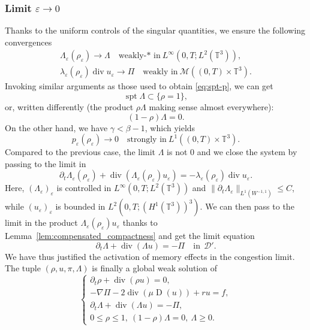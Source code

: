 \documentclass[JEP,XML,SOM,Unicode,NoEqCountersInSection]{cedram}
\let\mathcal\mathscr
\newcommand{\<}{\bigl\langle}
\renewcommand{\>}{\bigr\rangle}
\DeclareMathOperator{\spt}{spt}
\newcommand{\labeleq}[1]{}
\newenvironment{subnumcasess}{\begin{equation*}\begin{cases}}{\end{cases}\end{equation*}}
\theoremstyle{definition}
\theoremstyle{remark}
\newcommand{\TT}{\mathbb{T}^3}
\DeclareMathOperator{\Div}{div}
\DeclareMathOperator{\D}{D}
\let\ep\varepsilon
\begin{document}
\subsubsection{Limit $\ep \rightarrow 0$}
Thanks to the uniform controls of the singular quantities, we ensure the following convergences
\begin{gather*}
\Lambda_\ep(\rho_\ep) \to \Lambda \quad \text{weakly-* in} ~ L^\infty(0,T;L^2(\TT)),\\
\lambda_\ep(\rho_\ep) \Div u_\ep \to \Pi \quad \text{weakly in} ~
\mathcal{M}((0,T)\times \TT).
\end{gather*}
Invoking similar arguments as those used to obtain \eqref{eq:spt-p}, we can get
\[
\spt \Lambda \subset \{ \rho = 1\},
\]
or, written differently (the product $\rho \Lambda$ making sense almost everywhere):
\[
(1-\rho) \Lambda = 0.
\]
On the other hand, we have $\gamma < \beta-1$, which yields
\begin{equation*}
p_\ep(\rho_\ep) \to 0 \quad\text{strongly in} ~ L^1((0,T)\times \TT).
\end{equation*}
Compared to the previous case, the limit $\Lambda$ is not $0$ and we close the system by passing to the limit in
\[
\partial_t \Lambda_\ep(\rho_\ep) + \Div(\Lambda_\ep(\rho_\ep) u_\ep) = - \lambda_\ep(\rho_\ep)\Div u_\ep.
\]
Here, $(\Lambda_\ep)_\ep$ is controlled in $L^\infty(0,T; L^2(\TT))$ and $\|\partial_t \Lambda_\ep\|_{L^1(W^{-1,1})}\leq C$, while $(u_\ep)_\ep$ is bounded in $L^2(0,T;(H^1(\TT))^3)$.
We can then pass to the limit in the product $\Lambda_\ep(\rho_\ep) u_\ep$ thanks to Lemma~\ref{lem:compensated_compactness} and get the limit equation
\[
\partial_t \Lambda + \Div(\Lambda u) = -\Pi \quad \text{in} ~ ~\mathcal{D}'.
\]
We have thus justified the activation of memory effects in the congestion limit.
The tuple $(\rho, u, \pi,\Lambda)$ is finally a global weak solution of
\begin{subnumcasess}{\labeleq{xxx}}
\partial_t \rho + \Div (\rho u) = 0, \\
-\nabla \Pi - 2 \Div(\mu \D(u)) + r u = f, \\
\partial_t \Lambda + \Div(\Lambda u) = -\Pi,\\
0 \leq \rho \leq 1, ~(1-\rho)\Lambda = 0,~ \Lambda \geq 0.
\end{subnumcasess}%
\end{document}
